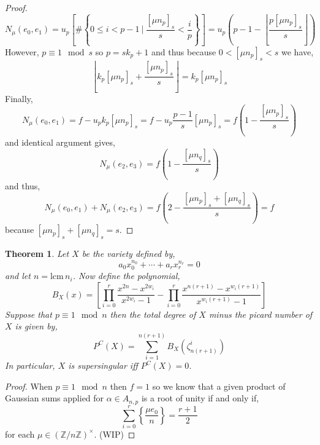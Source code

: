 \documentclass{article}
\newcommand{\Z}{\mathbb{Z}}
\newcommand{\lcm}[0]{\mathrm{lcm} \,}
\newtheorem{theorem}{Theorem}[section]
\theoremstyle{definition}
\theoremstyle{definition}
\theoremstyle{remark}
\begin{document}
\begin{proof}
\[ N_\mu(e_0, e_1) = u_p \left[\#\left\{ 0 \le i < p - 1 \: \bigg| \: \frac{[\mu n_p]_s}{s} < \frac{i}{p} \right\}\right] = u_p \left( p - 1 - \left\lfloor \frac{p [\mu n_p]_s}{s} \right\rfloor \right) \]
However, $p \equiv 1 \mod s$ so $p = s k_p + 1$ and thus because $0 < [\mu n_p]_s < s$ we have,
\[ \left\lfloor k_p [\mu n_p]_s + \frac{[\mu n_p]_s}{s} \right\rfloor  = k_p [\mu n_p]_s \]  
Finally,
\[ N_\mu(e_0, e_1) = f - u_p k_p [\mu n_p]_s = f - u_p \frac{p - 1}{s} [\mu n_p]_s = f \left(1 - \frac{[\mu n_p]_s}{s} \right) \] 
and identical argument gives,
\[ N_\mu(e_2, e_3) = f \left(1 - \frac{[\mu n_q]_s}{s} \right) \] 
and thus,
\[ N_\mu(e_0, e_1) + N_\mu(e_2, e_3) = f \left(2 - \frac{[\mu n_p]_s + [\mu n_q]_s}{s} \right) = f \]
because $[\mu n_p]_s + [\mu n_q]_s = s$. 
\end{proof}

\begin{theorem}
Let $X$ be the variety defined by,
\[ a_0 x_0^{n_0} + \cdots + a_r x_r^{n_r} = 0 \]
and let $n = \lcm{n_i}$. Now define the polynomial,
\[ B_X(x) = \left[ \prod_{i = 0}^r \frac{x^{2n} - x^{2 w_i}}{x^{2w_i} - 1} - \prod_{i = 0}^r \frac{x^{n(r+1)} - x^{w_i(r+1)}}{x^{w_i(r+1)} - 1} \right] \]
Suppose that $p \equiv 1 \mod{n}$ then the total degree of $X$ minus the picard number of $X$ is given by,
\[ P^C(X) = \sum_{i = 1}^{n(r+1)} B_X(\zeta_{n(r+1)}^i)  \]
In particular, $X$ is supersingular iff $P^C(X) = 0$.
\end{theorem}

\begin{proof}
When $p \equiv 1 \mod{n}$ then $f = 1$ so we know that a given product of Gaussian sums applied for $\alpha \in A_{n,p}$ is a root of unity if and only if,
\[ \sum_{i = 0}^r \left\{ \frac{\mu e_0}{n} \right\} = \frac{r+1}{2} \]
for each $\mu \in (\Z / n \Z)^\times$. (WIP)
\end{proof}
\end{document}
